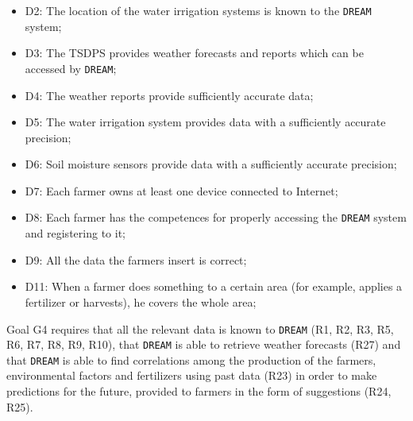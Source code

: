 \documentclass{article}
\begin{document}
\begin{itemize}
    \item D2: The location of the water irrigation systems is known to the \verb|DREAM| system;
    
    \item D3: The TSDPS provides weather forecasts and reports which can be accessed by \verb|DREAM|;
    
    \item D4: The weather reports provide sufficiently accurate data;
    
    \item D5: The water irrigation system provides data with a sufficiently accurate precision;
    
    \item D6: Soil moisture sensors provide data with a sufficiently accurate precision;
    
    \item D7: Each farmer owns at least one device connected to Internet;
    
    \item D8: Each farmer has the competences for properly accessing the \verb|DREAM| system and registering to it;
    
    \item D9: All the data the farmers insert is correct;
    
    \item D11: When a farmer does something to a certain area (for example, applies a fertilizer or harvests), he covers the whole area;
\end{itemize}
Goal G4 requires that all the relevant data is known to \verb|DREAM| (R1, R2, R3, R5, R6, R7, R8, R9, R10), that \verb|DREAM| is able to retrieve weather forecasts (R27) and that \verb|DREAM| is able to find correlations among the production of the farmers, environmental factors and fertilizers using past data (R23) in order to make predictions for the future, provided to farmers in the form of suggestions (R24, R25).
\end{document}
